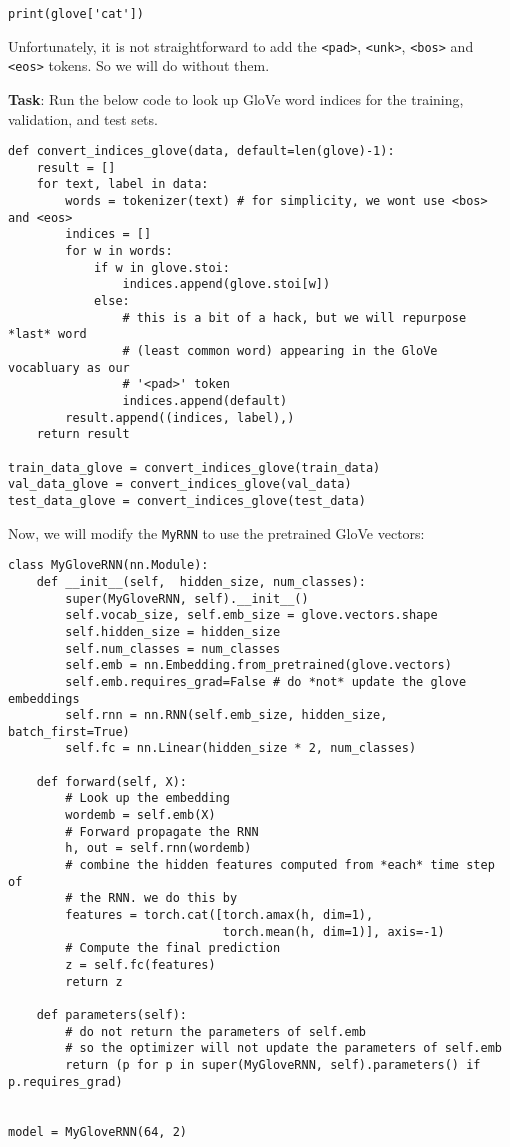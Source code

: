 \documentclass[
  letterpaper,
  DIV=11,
  numbers=noendperiod]{scrartcl}
\begin{document}
\begin{verbatim}
print(glove['cat'])
\end{verbatim}

Unfortunately, it is not straightforward to add the
\texttt{\textless{}pad\textgreater{}},
\texttt{\textless{}unk\textgreater{}},
\texttt{\textless{}bos\textgreater{}} and
\texttt{\textless{}eos\textgreater{}} tokens. So we will do without
them.

\textbf{Task}: Run the below code to look up GloVe word indices for the
training, validation, and test sets.

\begin{verbatim}
def convert_indices_glove(data, default=len(glove)-1):
    result = []
    for text, label in data:
        words = tokenizer(text) # for simplicity, we wont use <bos> and <eos>
        indices = []
        for w in words:
            if w in glove.stoi:
                indices.append(glove.stoi[w])
            else:
                # this is a bit of a hack, but we will repurpose *last* word
                # (least common word) appearing in the GloVe vocabluary as our
                # '<pad>' token
                indices.append(default)
        result.append((indices, label),)
    return result

train_data_glove = convert_indices_glove(train_data)
val_data_glove = convert_indices_glove(val_data)
test_data_glove = convert_indices_glove(test_data)
\end{verbatim}

Now, we will modify the \texttt{MyRNN} to use the pretrained GloVe
vectors:

\begin{verbatim}
class MyGloveRNN(nn.Module):
    def __init__(self,  hidden_size, num_classes):
        super(MyGloveRNN, self).__init__()
        self.vocab_size, self.emb_size = glove.vectors.shape
        self.hidden_size = hidden_size
        self.num_classes = num_classes
        self.emb = nn.Embedding.from_pretrained(glove.vectors)
        self.emb.requires_grad=False # do *not* update the glove embeddings
        self.rnn = nn.RNN(self.emb_size, hidden_size, batch_first=True)
        self.fc = nn.Linear(hidden_size * 2, num_classes)

    def forward(self, X):
        # Look up the embedding
        wordemb = self.emb(X)
        # Forward propagate the RNN
        h, out = self.rnn(wordemb)
        # combine the hidden features computed from *each* time step of
        # the RNN. we do this by 
        features = torch.cat([torch.amax(h, dim=1),
                              torch.mean(h, dim=1)], axis=-1)
        # Compute the final prediction
        z = self.fc(features)
        return z

    def parameters(self):
        # do not return the parameters of self.emb 
        # so the optimizer will not update the parameters of self.emb
        return (p for p in super(MyGloveRNN, self).parameters() if p.requires_grad)


model = MyGloveRNN(64, 2)
\end{verbatim}
\end{document}
